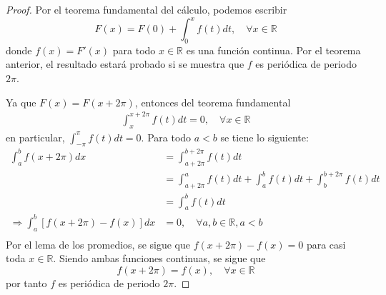 \documentclass[12pt]{report}
\theoremstyle{largebreak}
\begin{document}
    \begin{proof}
        Por el teorema fundamental del cálculo, podemos escribir
        \begin{equation*}
            F(x)=F(0)+\int_{0}^xf(t)dt,\quad\forall x\in\mathbb{R}
        \end{equation*}
        donde $f(x)=F'(x)$ para todo $x\in\mathbb{R}$ es una función continua. Por el teorema anterior, el resultado estará probado si se muestra que $f$ es periódica de periodo $2\pi$.

        Ya que $F(x)=F(x+2\pi)$, entonces del teorema fundamental
        \begin{equation*}
            \begin{split}
                \int_{x}^{ x+2\pi}f(t)dt=0,\quad\forall x\in\mathbb{R}
            \end{split}
        \end{equation*}
        en particular, $\int_{ -\pi}^{\pi}f(t)dt=0$. Para todo $a<b$ se tiene lo siguiente:
        \begin{equation*}
            \begin{split}
                \int_a^bf(x+2\pi)dx&=\int_{ a+2\pi}^{ b+2\pi}f(t)dt\\
                &=\int_{ a+2\pi}^{a}f(t)dt+\int_a^bf(t)dt+\int_b^{ b+2\pi}f(t)dt \\
                &=\int_a^bf(t)dt\\
                \Rightarrow \int_{ a}^b\left[f(x+2\pi)-f(x) \right]dx&=0,\quad\forall a,b\in\mathbb{R}, a<b \\
            \end{split}
        \end{equation*}
        Por el lema de los promedios, se sigue que $f(x+2\pi)-f(x)=0$ para casi toda $x\in\mathbb{R}$. Siendo ambas funciones continuas, se sigue que
        \begin{equation*}
            f(x+2\pi)=f(x),\quad\forall x\in\mathbb{R}
        \end{equation*}
        por tanto $f$ es periódica de periodo $2\pi$.
    \end{proof}
\end{document}
